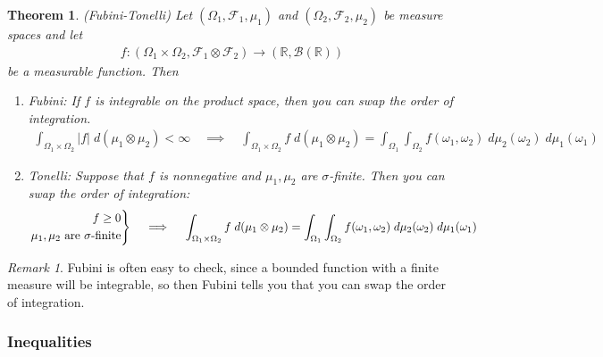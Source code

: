 \documentclass[12pt]{article}
\theoremstyle{plain}
\newtheorem{thm}{Theorem}[section]
\theoremstyle{definition}
\theoremstyle{remark}
\newtheorem*{rmk}{Remark}
\newcommand{\ra}{\rightarrow}
\newcommand{\sF}{\mathscr{F}}
\newcommand{\sB}{\mathscr{B}}
\newcommand{\R}{\mathbb{R}}
\newenvironment{rcases}
  {\left.\begin{aligned}}
  {\end{aligned}\right\rbrace}
\begin{document}
\begin{thm}\emph{(Fubini-Tonelli)}
Let
$(\Omega_1,\sF_1,\mu_1)$ and
$(\Omega_2,\sF_2,\mu_2)$
be measure spaces and let
\begin{align*}
  f:
  (\Omega_1\times \Omega_2, \sF_1\otimes\sF_2)
  \ra
  (\R,\sB(\R))
\end{align*}
be a measurable function. Then
\begin{enumerate}
  \item \emph{Fubini}:
    If $f$ is integrable on the product space, then you can swap the
    order of integration.
    \begin{align*}
      \int_{\Omega_1\times \Omega_2}
      |f| \; d(\mu_1\otimes\mu_2)
      <\infty
      \quad\implies \quad
      \int_{\Omega_1\times \Omega_2}
      f \; d(\mu_1\otimes\mu_2)
      =
      \int_{\Omega_1}\int_{\Omega_2}
      f(\omega_1,\omega_2)
      \;d\mu_2(\omega_2) \;d\mu_1(\omega_1)
    \end{align*}

  \item \emph{Tonelli}:
    Suppose that $f$ is nonnegative and $\mu_1,\mu_2$ are
    $\sigma$-finite. Then you can swap the order of integration:
    \begin{align*}
      \begin{rcases}
      f\geq 0 \\
      \text{$\mu_1,\mu_2$ are $\sigma$-finite}
      \end{rcases}
      \quad\implies \quad
      \int_{\Omega_1\times \Omega_2}
      f \; d(\mu_1\otimes\mu_2)
      =
      \int_{\Omega_1}\int_{\Omega_2}
      f(\omega_1,\omega_2)
      \;d\mu_2(\omega_2) \;d\mu_1(\omega_1)
    \end{align*}
\end{enumerate}
\end{thm}
\begin{rmk}
Fubini is often easy to check, since a bounded function with a finite
measure will be integrable, so then Fubini tells you that you can swap
the order of integration.
\end{rmk}


\subsubsection{Inequalities}
\end{document}

